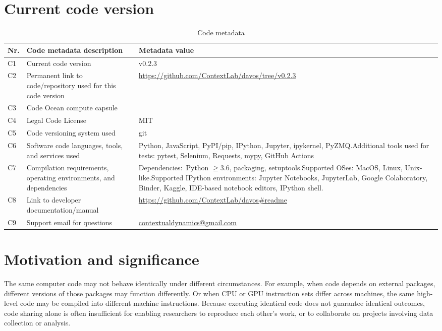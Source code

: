 \documentclass[preprint,12pt,a4paper]{elsarticle}
\begin{document}
\section*{Current code version}

\begin{table}[H]
\begin{tabular}{|l|p{6.5cm}|p{6.5cm}|}
\hline
\textbf{Nr.} & \textbf{Code metadata description} & \textbf{Metadata value} \\
\hline
C1 & Current code version &  v0.2.3 \\
\hline
C2 & Permanent link to code/repository used for this code version & \url{https://github.com/ContextLab/davos/tree/v0.2.3} \\
\hline
C3 & Code Ocean compute capsule & \\
\hline
C4 & Legal Code License & MIT \\
\hline
C5 & Code versioning system used & git \\
\hline
C6 & Software code languages, tools, and services used & Python, JavaScript, PyPI/pip, IPython, Jupyter, ipykernel, PyZMQ.\newline Additional tools used for tests: pytest, Selenium, Requests, mypy, GitHub Actions \\
\hline
C7 & Compilation requirements, operating environments, and
     dependencies & Dependencies:~Python $\geq 3.6$, packaging, setuptools.\newline Supported OSes: MacOS, Linux, Unix-like.\newline Supported IPython environments: Jupyter Notebooks, JupyterLab, Google Colaboratory, Binder, Kaggle, IDE-based notebook editors, IPython shell. \\
\hline
C8 & Link to developer documentation/manual & \url{https://github.com/ContextLab/davos\#readme} \\
\hline
C9 & Support email for questions & \href{mailto:contextualdynamics@gmail.com}{contextualdynamics@gmail.com} \\
\hline
\end{tabular}
\caption{Code metadata}
\label{}
\end{table}

\linenumbers


\section{Motivation and significance}

The same computer code may not behave identically under different
circumstances. For example, when code depends on external packages,
different versions of those packages may function differently. Or
when CPU or GPU instruction sets differ across machines, the same
high-level code may be compiled into different machine instructions.
Because executing identical code does not guarantee identical
outcomes, code sharing alone is often insufficient for enabling
researchers to reproduce each other's work, or to collaborate on
projects involving data collection or analysis.
\end{document}
